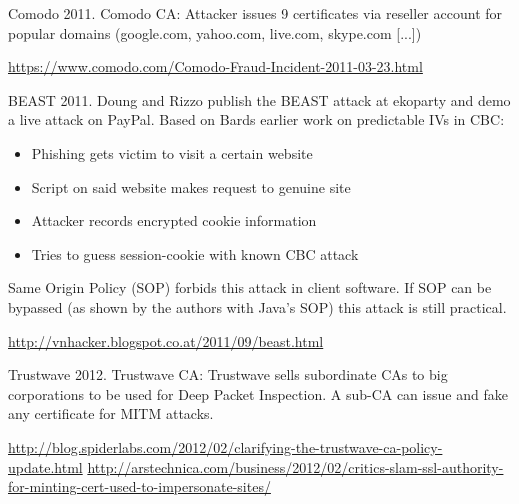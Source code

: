 \begin{frame}{Comodo}
  2011. Comodo CA: Attacker issues 9 certificates via reseller account for popular domains (google.com, yahoo.com, live.com, skype.com [...])
  
  \vspace{160px}

  \tiny
  \url{https://www.comodo.com/Comodo-Fraud-Incident-2011-03-23.html}
\end{frame}

\begin{frame}{BEAST}
  2011. Doung and Rizzo publish the BEAST attack at ekoparty and demo a live attack on PayPal. Based on Bards earlier work on predictable IVs in CBC:
  \begin{itemize}
    \item Phishing gets victim to visit a certain website
    \item Script on said website makes request to genuine site
    \item Attacker records encrypted cookie information
    \item Tries to guess session-cookie with known CBC attack
  \end{itemize}
  Same Origin Policy (SOP) forbids this attack in client software. If SOP can be bypassed (as shown by the authors with Java's SOP) this attack is still practical.
  
  \vspace{30px}

  \tiny
  \url{http://vnhacker.blogspot.co.at/2011/09/beast.html}
\end{frame}


\begin{frame}{Trustwave}
  2012. Trustwave CA: Trustwave sells subordinate CAs to big corporations to be used for Deep Packet Inspection.
  \newline
  \newline
  A sub-CA can issue and fake any certificate for MITM attacks.


  \vspace{80px}

  \tiny
  \url{http://blog.spiderlabs.com/2012/02/clarifying-the-trustwave-ca-policy-update.html}
  \url{http://arstechnica.com/business/2012/02/critics-slam-ssl-authority-for-minting-cert-used-to-impersonate-sites/}
\end{frame}

